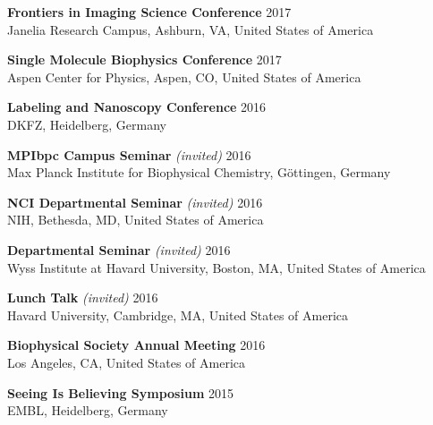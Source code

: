 \documentclass[margin,line]{res}
\begin{document}
\begin{resume}
\vspace*{-2.5mm}
{\bf Frontiers in Imaging Science Conference} \hfill 2017\\
Janelia Research Campus, Ashburn, VA, United States of America %

\vspace*{-2.5mm}
{\bf Single Molecule Biophysics Conference}  \hfill 2017\\
Aspen Center for Physics, Aspen, CO, United States of America

\vspace*{-2.5mm}
{\bf Labeling and Nanoscopy Conference} \hfill 2016\\
DKFZ, Heidelberg, Germany

\vspace*{-2.5mm}
{\bf MPIbpc Campus Seminar} {\it (invited)}  \hfill 2016\\
Max Planck Institute for Biophysical Chemistry, Göttingen, Germany

\vspace*{-2.5mm}
{\bf NCI Departmental Seminar} {\it (invited)}  \hfill 2016\\
NIH, Bethesda, MD, United States of America

\vspace*{-2.5mm}
{\bf Departmental Seminar} {\it (invited)} \hfill 2016\\
Wyss Institute at Havard University, Boston, MA, United States of America

\vspace*{-2.5mm}
{\bf Lunch Talk} {\it (invited)}  \hfill 2016\\
Havard University, Cambridge, MA, United States of America

\vspace*{-2.5mm}
{\bf Biophysical Society Annual Meeting}  \hfill 2016\\
Los Angeles, CA, United States of America

\vspace*{-2.5mm}
{\bf Seeing Is Believing Symposium}  \hfill 2015\\
EMBL, Heidelberg, Germany


\end{resume}
\end{document}

